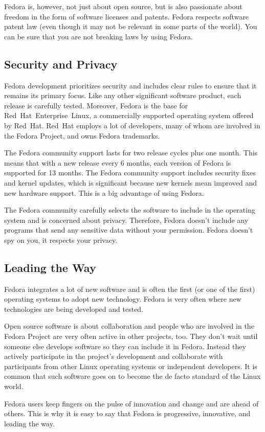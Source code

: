 Fedora is, however, not just about open source, but is also passionate about freedom in the form of software licenses and patents. Fedora respects software patent law (even though it may not be relevant in some parts of the world). You can be sure that you are not breaking laws by using Fedora.

\subsection*{Security and Privacy}

Fedora development prioritizes security and includes clear rules to ensure that it remains its primary focus. Like any other significant software product, each release is carefully tested. Moreover, Fedora is the base for Red~Hat~Enterprise~Linux, a commercially supported operating system offered by Red~Hat. Red~Hat employs a lot of developers, many of whom are involved in the Fedora Project, and owns Fedora trademarks.

The Fedora community support lasts for two release cycles plus one month. This means that with a new release every 6 months, each version of Fedora is supported for 13 months. The Fedora community support includes security fixes and kernel updates, which is significant because new kernels mean improved and new hardware support. This is a big advantage of using Fedora.

The Fedora community carefully selects the software to include in the operating system and is concerned about privacy. Therefore, Fedora doesn't include any programs that send any sensitive data without your permission. Fedora doesn't spy on you, it respects your privacy.

\subsection*{Leading the Way}

Fedora integrates a lot of new software and is often the first (or one of the first) operating systems to adopt new technology. Fedora is very often where new technologies are being developed and tested.

Open source software is about collaboration and people who are involved in the Fedora Project are very often active in other projects, too. They don't wait until someone else develops software so they can include it in Fedora. Instead they actively participate in the project's development and collaborate with participants from other Linux operating systems or independent developers. It is common that such software goes on to become the de facto standard of the Linux world.

Fedora users keep fingers on the pulse of innovation and change and are ahead of others. This is why it is easy to say that Fedora is progressive, innovative, and leading the way.
